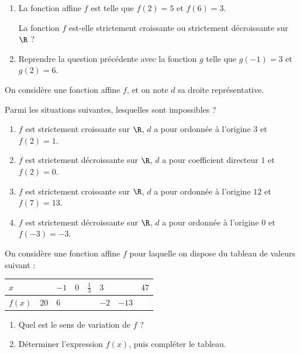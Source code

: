 \exo

\begin{enumerate}
\item La fonction affine $f$ est telle que $f(2)=5$ et $f(6)=3$.

La fonction $f$ est-elle strictement croissante ou strictement décroissante sur $\R$ ?
\item Reprendre la question précédente avec la fonction $g$ telle que $g(-1)=3$ et $g(2)=6$.
\end{enumerate}

\exo

On considère une fonction affine $f$, et on note $d$ sa droite représentative.

Parmi les situations suivantes, lesquelles sont impossibles ?
\begin{enumerate}
\item $f$ est strictement croissante sur $\R$, $d$ a pour ordonnée à l'origine $3$ et $f(2)=1$.
\item $f$ est strictement décroissante sur $\R$, $d$ a pour coefficient directeur $1$ et $f(2)=0$.
\item $f$ est strictement croissante sur $\R$, $d$ a pour ordonnée à l'origine $12$ et $f(7)=13$.
\item $f$ est strictement décroissante sur $\R$, $d$ a pour ordonnée à l'origine $0$ et $f(-3)=-3$.
\end{enumerate}

\exo

On considère une fonction affine $f$ pour laquelle on dispose du tableau de valeurs suivant :
\begin{center}
\setlength{\tabcolsep}{0.1cm}
\renewcommand{\arraystretch}{1.5}
\begin{tabular}{
|>{\centering\arraybackslash}m{2cm}
*{7}{|>{\centering\arraybackslash}m{1.5cm}}|}
\hline 
$x$ & & $-1$ & $0$ & $\frac{1}{3}$ & $3$ & & $47$ \\
\hline
$f(x)$ & $20$ & $6$ & & & $-2$ & $-13$ & \\ 
\hline 
\end{tabular} 
\end{center}
\begin{enumerate}
\item Quel est le sens de variation de $f$ ?
\item Déterminer l'expression $f(x)$, puis compléter le tableau.
\end{enumerate}

\exo

